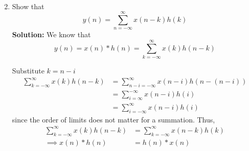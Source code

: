 \documentclass[journal,12pt,twocolumn]{IEEEtran}
\newcommand{\solution}{\noindent \textbf{Solution: }}
\numberwithin{equation}{section}
\renewcommand\thesection{\arabic{section}}
\renewcommand\thesection{\arabic{section}}
\begin{document}
\begin{enumerate}[label=\thesection.\arabic*]
\begin{align}
\end{align}
\item Show that
\begin{equation}
y(n) =  \sum_{n=-\infty}^{\infty}x(n-k)h(k)
\end{equation}
\solution We know that
	\begin{equation}
		y(n) = x(n)*h(n) = \sum_{k=-\infty}^{\infty}x(k)h(n-k)
	\end{equation}
	
	Substitute $k = n - i$
	\begin{align}
		 \sum_{k=-\infty}^{\infty}x(k)h(n-k) &=  \sum_{n - i =-\infty}^{\infty}x(n-i)h(n-(n-i)) \\
		 &= \sum_{i = \infty}^{-\infty} x(n - i) h(i) \\
		 &= \sum_{i = -\infty}^{\infty} x(n - i) h(i)
	\end{align}
	since the order of limits does not matter for a summation.
	Thus,
	\begin{align}
		\sum_{k=-\infty}^{\infty}x(k)h(n-k) &= \sum_{k=-\infty}^{\infty}x(n-k)h(k) \\
		\implies x(n) * h(n) &= h(n) * x(n)
	\end{align}

\end{enumerate}
%
\end{document}
